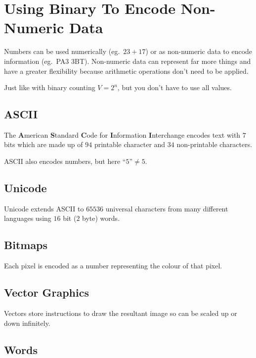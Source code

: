 \section{Using Binary To Encode Non-Numeric Data}\label{sec:using_binary_to_encode_non_numeric_data}

Numbers can be used numerically (eg.\ \(23 + 17\)) or as non-numeric data to encode information (eg.\ PA3 3BT).
Non-numeric data can represent far more things and have a greater flexibility because arithmetic operations don't need to be applied.

Just like with binary counting \(V=2^n\), but you don't have to use all values.

\subsection{ASCII}\label{sub:ascii}

The \textbf{A}merican \textbf{S}tandard \textbf{C}ode for \textbf{I}nformation \textbf{I}nterchange encodes text with \(7\) bits which are made up of \(94\) printable character and \(34\) non-printable characters.

\begin{note}
	ASCII also encodes numbers, but here \(\textrm{``5''} \neq 5\).
\end{note}

\subsection{Unicode}\label{sub:unicode}

Unicode extends ASCII to \(65536\) universal characters from many different languages using \(16\) bit (\(2\) byte) words.

\subsection{Bitmaps}\label{sub:bitmaps}

Each pixel is encoded as a number representing the colour of that pixel.

\subsection{Vector Graphics}\label{sub:vector_graphics}

Vectors store instructions to draw the resultant image so can be scaled up or down infinitely.

\subsection{Words}\label{sub:words}

